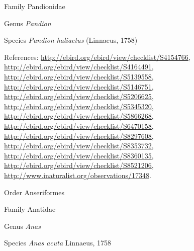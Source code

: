 \documentclass[9pt, article]{memoir}
\begin{document}
\begin{multicols}{2}
\vspace{6pt}\noindent\hspace{24pt}Family Pandionidae


\vspace{6pt}\noindent\hspace{30pt}Genus \textit{Pandion}


\vspace{6pt}\noindent\hspace{36pt}Species \textit{Pandion haliaetus} (Linnaeus, 1758)


\vspace{6pt}References: 
\url{http://ebird.org/ebird/view/checklist/S4154766}, 
\url{http://ebird.org/ebird/view/checklist/S4164491}, 
\url{http://ebird.org/ebird/view/checklist/S5139558}, 
\url{http://ebird.org/ebird/view/checklist/S5146751}, 
\url{http://ebird.org/ebird/view/checklist/S5206625}, 
\url{http://ebird.org/ebird/view/checklist/S5345320}, 
\url{http://ebird.org/ebird/view/checklist/S5866268}, 
\url{http://ebird.org/ebird/view/checklist/S6470158}, 
\url{http://ebird.org/ebird/view/checklist/S8297608}, 
\url{http://ebird.org/ebird/view/checklist/S8353732}, 
\url{http://ebird.org/ebird/view/checklist/S8360135}, 
\url{http://ebird.org/ebird/view/checklist/S8521206}, 
\url{http://www.inaturalist.org/observations/17348}.

\vspace{6pt}\noindent\hspace{18pt}Order Anseriformes


\vspace{6pt}\noindent\hspace{24pt}Family Anatidae


\vspace{6pt}\noindent\hspace{30pt}Genus \textit{Anas}


\vspace{6pt}\noindent\hspace{36pt}Species \textit{Anas acuta} Linnaeus, 1758



\end{multicols}
\end{document}

